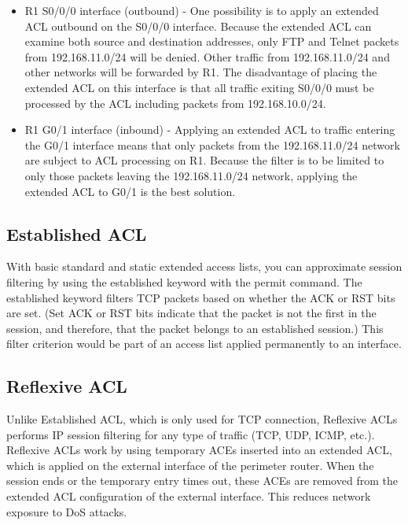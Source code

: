 \begin{itemize}
\item R1 S0/0/0 interface (outbound) - One possibility is to apply an extended ACL outbound on the S0/0/0 interface. Because the extended ACL can examine both source and destination addresses, only FTP and Telnet packets from 192.168.11.0/24 will be denied. Other traffic from 192.168.11.0/24 and other networks will be forwarded by R1. The disadvantage of placing the extended ACL on this interface is that all traffic exiting S0/0/0 must be processed by the ACL including packets from 192.168.10.0/24.

\item R1 G0/1 interface (inbound) - Applying an extended ACL to traffic entering the G0/1 interface means that only packets from the 192.168.11.0/24 network are subject to ACL processing on R1. Because the filter is to be limited to only those packets leaving the 192.168.11.0/24 network, applying the extended ACL to G0/1 is the best solution.
\end{itemize}

\subsection{Established ACL}

With basic standard and static extended access lists, you can approximate session filtering by using the established keyword with the permit command. The established keyword filters TCP packets based on whether the ACK or RST bits are set. (Set ACK or RST bits indicate that the packet is not the first in the session, and therefore, that the packet belongs to an established session.) This filter criterion would be part of an access list applied permanently to an interface.

\subsection{Reflexive ACL}

Unlike Established ACL, which is only used for TCP connection, Reflexive ACLs performs IP session filtering for any type of traffic (TCP, UDP, ICMP, etc.). Reflexive ACLs work by using temporary ACEs inserted into an extended ACL, which is applied on the external interface of the perimeter router. When the session ends or the temporary entry times out, these ACEs are removed from the extended ACL configuration of the external interface. This reduces network exposure to DoS attacks.


